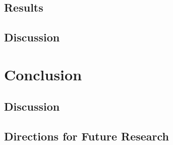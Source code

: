 \documentclass[onehalf,11pt]{beavtex}
\begin{document}
\section{Results}
\section{Discussion}

\chapter{Conclusion}
\section{Discussion}
\section{Directions for Future Research}




%
\end{document}
